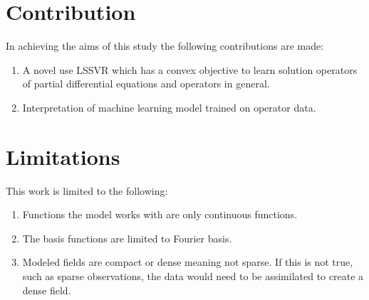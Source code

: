 \section{Contribution}
\noindent In achieving the aims of this study the following contributions are made:
\begin{enumerate}
    \item A novel use LSSVR which has a convex objective to learn solution operators of partial differential equations and operators in general.
    \item Interpretation of machine learning model trained on operator data.
\end{enumerate}

\section{Limitations}
\noindent This work is limited to the following:
\begin{enumerate}
    \item Functions the model works with are only continuous functions.
    \item The basis functions are limited to Fourier basis.
    \item Modeled fields are compact or dense meaning not sparse. If this is not true, such as sparse observations, the data would need to be assimilated to create a dense field.
\end{enumerate}


